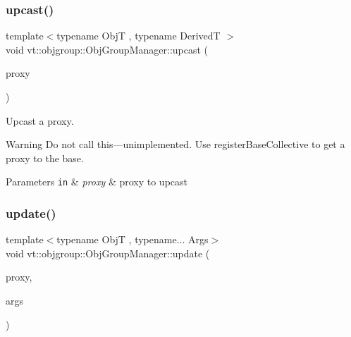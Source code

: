 \subsubsection{\texorpdfstring{upcast()}{upcast()}}
{\footnotesize\ttfamily template$<$typename ObjT , typename DerivedT $>$ \\
void vt\+::objgroup\+::\+Obj\+Group\+Manager\+::upcast (\begin{DoxyParamCaption}\item[{\hyperlink{structvt_1_1objgroup_1_1_obj_group_manager_aea65eef52f240a52210132eef5ce591f}{Proxy\+Type}$<$ ObjT $>$}]{proxy }\end{DoxyParamCaption})}



Upcast a proxy. 

\begin{DoxyWarning}{Warning}
Do not call this---unimplemented. Use {\ttfamily register\+Base\+Collective} to get a proxy to the base.
\end{DoxyWarning}

\begin{DoxyParams}[1]{Parameters}
\mbox{\tt in}  & {\em proxy} & proxy to upcast \\
\hline
\end{DoxyParams}
\mbox{\label{structvt_1_1objgroup_1_1_obj_group_manager_abd0f61b0578a268a27420f2c38e3b12d}} 
\subsubsection{\texorpdfstring{update()}{update()}\hspace{0.1cm}{\footnotesize\ttfamily [1/2]}}
{\footnotesize\ttfamily template$<$typename ObjT , typename... Args$>$ \\
void vt\+::objgroup\+::\+Obj\+Group\+Manager\+::update (\begin{DoxyParamCaption}\item[{\hyperlink{structvt_1_1objgroup_1_1_obj_group_manager_adba6c8ecb0f4c30e719f1abb995cfc9b}{Proxy\+Elm\+Type}$<$ ObjT $>$}]{proxy,  }\item[{Args \&\&...}]{args }\end{DoxyParamCaption})}



